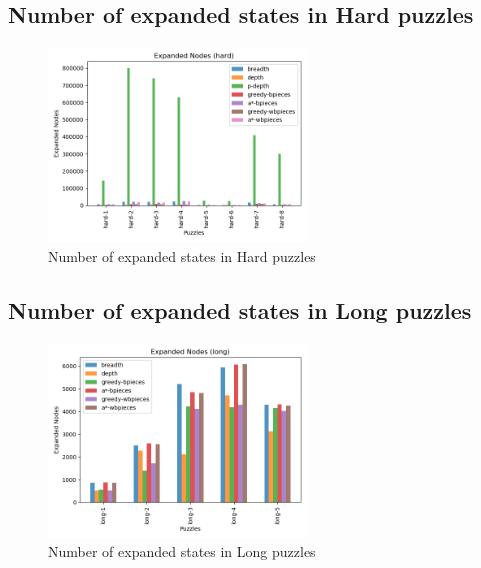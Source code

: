 \documentclass[conference]{IEEEtran}
\begin{document}
\subsection{Number of expanded states in Hard puzzles}
\begin{figure}[H]
    \centerline{\includegraphics[width=260px]{../../graphics/expandedNodes-hard.png}}
    \caption{Number of expanded states in Hard puzzles}
\end{figure}

\subsection{Number of expanded states in Long puzzles}
\begin{figure}[H]
    \centerline{\includegraphics[width=260px]{../../graphics/expandedNodes-long.png}}
    \caption{Number of expanded states in Long puzzles}
\end{figure}
\end{document}
